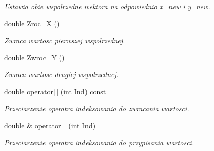 \begin{DoxyCompactItemize}
\begin{DoxyCompactList}\small\item\em Ustawia obie wspolrzedne wektora na odpowiednio x\+\_\+new i y\+\_\+new. \end{DoxyCompactList}\item 
\hypertarget{class_wektor2_d_aa52f09def60840859082e2c8728928f7}{double \hyperlink{class_wektor2_d_aa52f09def60840859082e2c8728928f7}{Zroc\+\_\+\+X} ()}\label{class_wektor2_d_aa52f09def60840859082e2c8728928f7}

\begin{DoxyCompactList}\small\item\em Zwraca wartosc pierwszej wspolrzednej. \end{DoxyCompactList}\item 
\hypertarget{class_wektor2_d_ad87d085bf5865039317476080b3cda69}{double \hyperlink{class_wektor2_d_ad87d085bf5865039317476080b3cda69}{Zwroc\+\_\+\+Y} ()}\label{class_wektor2_d_ad87d085bf5865039317476080b3cda69}

\begin{DoxyCompactList}\small\item\em Zwraca wartosc drugiej wspolrzednej. \end{DoxyCompactList}\item 
\hypertarget{class_wektor2_d_ad02b05aa715c7c5f52b11a45af33a725}{double \hyperlink{class_wektor2_d_ad02b05aa715c7c5f52b11a45af33a725}{operator\mbox{[}$\,$\mbox{]}} (int Ind) const }\label{class_wektor2_d_ad02b05aa715c7c5f52b11a45af33a725}

\begin{DoxyCompactList}\small\item\em Przeciarzenie operatra indeksowania do zwracania wartosci. \end{DoxyCompactList}\item 
\hypertarget{class_wektor2_d_a1043b8760379f4720ed57913b1241400}{double \& \hyperlink{class_wektor2_d_a1043b8760379f4720ed57913b1241400}{operator\mbox{[}$\,$\mbox{]}} (int Ind)}\label{class_wektor2_d_a1043b8760379f4720ed57913b1241400}

\begin{DoxyCompactList}\small\item\em Przeciarzenie operatra indeksowania do przypisania wartosci. \end{DoxyCompactList}\end{DoxyCompactItemize}


